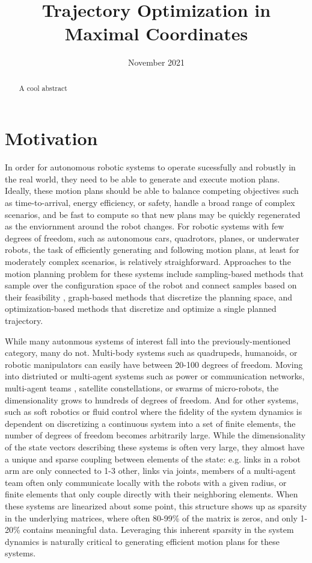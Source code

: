 \documentclass[conference]{IEEEtran}
\title{\LARGE \bf
    Trajectory Optimization in Maximal Coordinates
}
\date{November 2021}
\author{\IEEEauthorblockN{Brian E. Jackson$^*$}
    \IEEEauthorblockA{\textit{Robotics Institute} \\
    \textit{Carnegie Mellon University}\\
    Pittsburgh, USA \\
    brianjackson@cmu.edu}
}
\begin{document}
\maketitle

\begin{abstract}
    A cool abstract
\end{abstract}

\section{Motivation}
In order for autonomous robotic systems to operate sucessfully and robustly in the real 
world, they need to be able to generate and execute motion plans. Ideally, these motion 
plans should be able to balance competing objectives such as time-to-arrival, energy 
efficiency, or safety, handle a broad range of complex scenarios, and be fast to compute
so that new plans may be quickly regenerated as the enviornment around the robot changes.
For robotic systems with few degrees of freedom, such as autonomous cars, quadrotors, planes,
or underwater robots, the task of efficiently generating and following motion plans, at least
for moderately complex scenarios, is relatively straighforward. Approaches to the motion 
planning problem for these systems include sampling-based methods that sample over the 
configuration space of the robot and connect samples based on their feasibility 
\cite{lavalle2001rapidly}, graph-based
methods that discretize the planning space, and optimization-based methods 
\cite{howell_ALTRO_2019,jackson_ALTROC_2021,li_Iterative_2004,hargraves_Direct_1987} that 
discretize and optimize a single planned trajectory. 

While many autonmous systems of interest fall into the previously-mentioned category, many
do not. Multi-body systems such as quadrupeds, humanoids, or robotic manipulators can easily
have between 20-100 degrees of freedom. Moving into distriuted or multi-agent systems such
as power or communication networks, multi-agent teams \cite{jackson_Scalable_2020}, 
satellite constellations, or swarms 
of micro-robots, the dimensionality grows to hundreds of degrees of freedom. And for other
systems, such as soft robotics or fluid control where the fidelity of the system dynamics is
dependent on discretizing a continuous system into a set of finite elements, the number of 
degrees of freedom becomes arbitrarily large. While the dimensionality of the state vectors
describing these systems is often very large, they almost have a unique and sparse coupling
between elements of the state: e.g. links in a robot arm are only connected to 1-3 other, 
links via joints, members of a multi-agent team often only communicate locally with the 
robots with a given radius, or finite elements that only couple directly with their 
neighboring elements. When these systems are linearized about some point, this structure 
shows up as sparsity in the underlying matrices, where often 80-99\% of the matrix is zeros,
and only 1-20\% contains meaningful data. Leveraging this inherent sparsity in the system 
dynamics is naturally critical to generating efficient motion plans for these systems.
\end{document}
